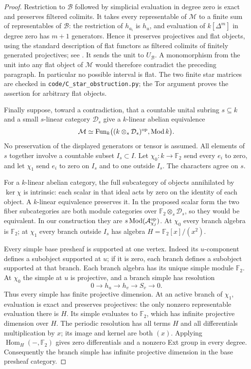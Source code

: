 \begin{proof}
Restriction to $\mathcal B$ followed by simplicial evaluation in degree zero is exact and preserves filtered colimits. It takes every representable of $\mathcal M$ to a finite sum of representables of $\mathcal B$: the restriction of $h_{a_i}$ is $h_u$, and evaluation of $k[\Delta^m]$ in degree zero has $m+1$ generators. Hence it preserves projectives and flat objects, using the standard description of flat functors as filtered colimits of finitely generated projectives; see \citet[p.~5]{Krause2016C}. It sends the unit to $U_{\mathcal B}$. A monomorphism from the unit into any flat object of $\mathcal M$ would therefore contradict the preceding paragraph. In particular no possible interval is flat. The two finite star matrices are checked in \texttt{code/C\_star\_obstruction.py}; the Tor argument proves the assertion for arbitrary flat objects.

Finally suppose, toward a contradiction, that a countable unital subring $s\subseteq k$ and a small $s$-linear category $\mathcal D_s$ give a $k$-linear abelian equivalence
\[
 \mathcal M\simeq
 \operatorname{Fun}_k\bigl((k\otimes_s\mathcal D_s)^{\mathrm{op}},\operatorname{Mod} k\bigr).
\]
No preservation of the displayed generators or tensor is assumed. All elements of $s$ together involve a countable subset $I_s\subset I$. Let $\chi_0:k\to\mathbb F_2$ send every $e_i$ to zero, and let $\chi_1$ send $e_i$ to zero on $I_s$ and to one outside $I_s$. The characters agree on $s$.

For a $k$-linear abelian category, the full subcategory of objects annihilated by $\ker\chi$ is intrinsic: each scalar in that ideal acts by zero on the identity of each object. A $k$-linear equivalence preserves it. In the proposed scalar form the two fiber subcategories are both module categories over $\mathbb F_2\otimes_s\mathcal D_s$, so they would be equivalent. In our construction they are $s\operatorname{Mod}(\mathcal A_{\chi_j}^{\mathrm{op}})$. At $\chi_0$ every branch algebra is $\mathbb F_2$; at $\chi_1$ every branch outside $I_s$ has algebra $H=\mathbb F_2[x]/(x^2)$.

Every simple base presheaf is supported at one vertex. Indeed its $u$-component defines a subobject supported at $u$; if it is zero, each branch defines a subobject supported at that branch. Each branch algebra has its unique simple module $\mathbb F_2$. At $\chi_0$ the simple at $u$ is projective, and a branch simple has resolution
\[
 0\longrightarrow h_u\longrightarrow h_v\longrightarrow S_v\longrightarrow0.
\]
Thus every simple has finite projective dimension. At an active branch of $\chi_1$, evaluation is exact and preserves projectives: the only nonzero representable evaluation there is $H$. Its simple evaluates to $\mathbb F_2$, which has infinite projective dimension over $H$. The periodic resolution has all terms $H$ and all differentials multiplication by $x$; its image and kernel are both $(x)$. Applying $\operatorname{Hom}_H(-,\mathbb F_2)$ gives zero differentials and a nonzero Ext group in every degree. Consequently the branch simple has infinite projective dimension in the base presheaf category.


\end{proof}

